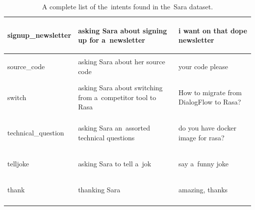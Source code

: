 \documentclass[bsc,frontabs,singlespacing,parskip,deptreport]{infthesis}
\begin{document}
{\begin{center}
\begin{longtable}{p{}|p{}|p{}}
    \hline
    \begin{spverbatim}signup_newsletter\end{spverbatim} & asking Sara about signing up for a~newsletter & \begin{spverbatim}i want on that dope newsletter\end{spverbatim} \\
    \hline
    \begin{spverbatim}source_code\end{spverbatim} & asking Sara about her source code & \begin{spverbatim}your code please\end{spverbatim} \\
    \hline
    \begin{spverbatim}switch\end{spverbatim} & asking Sara about switching from a~competitor tool to Rasa & \begin{spverbatim}How to migrate from DialogFlow to Rasa?\end{spverbatim} \\
    \hline
    \begin{spverbatim}technical_question\end{spverbatim} & asking Sara an~assorted technical questions & \begin{spverbatim}do you have docker image for rasa?\end{spverbatim} \\
    \hline
    \begin{spverbatim}telljoke\end{spverbatim} & asking Sara to tell a~jok & \begin{spverbatim}say a~funny joke\end{spverbatim} \\
    \hline
    \begin{spverbatim}thank\end{spverbatim} & thanking Sara & \begin{spverbatim}amazing, thanks\end{spverbatim} \\
    \hline
    \caption{A complete list of the~intents found in the~Sara dataset.}
    \label{tab:sara-intent-list}
    \end{longtable}
  \end{center}

}
\end{document}
